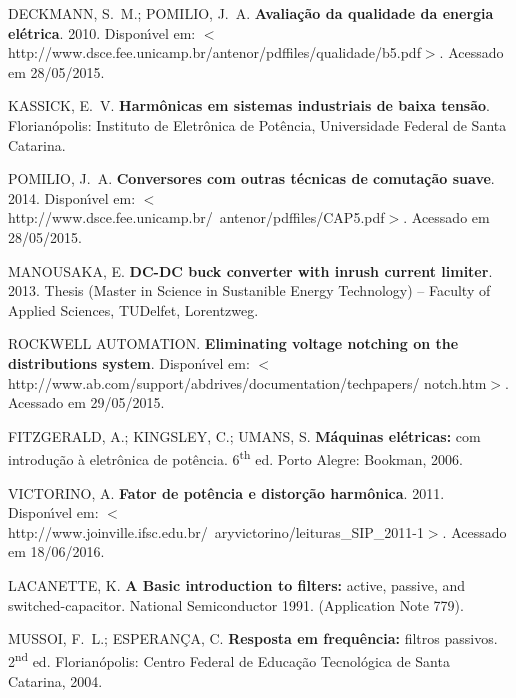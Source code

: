 \begin{thebibliography}{}
{DECKMANN, S.~M.; POMILIO, J.~A. \textbf{Avalia{\c{c}}{\~a}o da qualidade da
  energia el{\'e}trica}. 2010.
  Dispon{\'\i}vel em:
  $<$http://www.dsce.fee.unicamp.br/antenor/pdffiles/qualidade/b5.pdf$>$.
  Acessado em 28/05/2015.}


{KASSICK, E.~V. \textbf{Harm{\^o}nicas em sistemas industriais de baixa
  tens{\~a}o}.
Florian{\'o}polis: Instituto de Eletr\^onica de Pot\^encia,
  Universidade Federal de Santa Catarina.}

{POMILIO, J.~A. \textbf{Conversores com outras t{\'e}cnicas de
  comuta{\c{c}}{\~a}o suave}. 2014.
  Dispon{\'\i}vel em:
  $<$http://www.dsce.fee.unicamp.br/~antenor/pdffiles/CAP5.pdf$>$.}
  Acessado em 28/05/2015.


{MANOUSAKA, E.
\textbf{DC-DC buck converter with inrush current limiter}. 2013.
Thesis (Master in Science in Sustanible Energy Technology) -- Faculty of Applied Sciences, TUDelfet, Lorentzweg.}

{ROCKWELL AUTOMATION. \newblock \textbf{Eliminating voltage notching on the distributions
  system}.
  Dispon{\'\i}vel em:
  $<$http://www.ab.com/support/abdrives/documentation/techpapers/ notch.htm$>$.}
  Acessado em 29/05/2015.


{FITZGERALD, A.; KINGSLEY, C.; UMANS, S. \textbf{M{\'a}quinas el{\'e}tricas:} com
  introdu{\c{c}}{\~a}o {\`a} eletr{\^o}nica de pot{\^e}ncia. 6\textsuperscript{th} ed. Porto Alegre:
  Bookman, 2006.}

{VICTORINO, A. \textbf{Fator de pot\^encia e distor\c{c}\~ao harm\^onica}. 2011.
	Dispon{\'\i}vel em:
	$<$http://www.joinville.ifsc.edu.br/~aryvictorino/leituras\_SIP\_2011-1$>$. 
	Acessado em 18/06/2016.}


{LACANETTE, K. \textbf{A Basic introduction to filters:} active, passive, and
  switched-capacitor. National Semiconductor 1991. (Application Note 779).}

{MUSSOI, F.~L.; ESPERAN{\c{C}}A, C. \textbf{Resposta em frequ{\^e}ncia:} filtros
  passivos.
2\textsuperscript{nd} ed. Florian{\'o}polis: Centro Federal de Educa{\c{c}}{\~a}o
  Tecnol{\'o}gica de Santa Catarina, 2004.}


\end{thebibliography}
